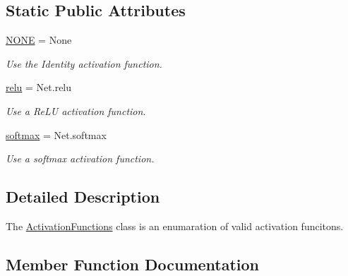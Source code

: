 \subsection*{Static Public Attributes}
\begin{DoxyCompactItemize}
\item 
\hyperlink{classDQN-Deepmind-NIPS-2013_1_1dqn_1_1ConvNet_1_1ActivationFunctions_a6fc2871aa17ddca2628226723a9116f5}{N\+O\+NE} = None
\begin{DoxyCompactList}\small\item\em Use the Identity activation function. \end{DoxyCompactList}\item 
\hyperlink{classDQN-Deepmind-NIPS-2013_1_1dqn_1_1ConvNet_1_1ActivationFunctions_a3684db68eadb8c00ed214af7bcbb2e3c}{relu} = Net.\+relu
\begin{DoxyCompactList}\small\item\em Use a Re\+LU activation function. \end{DoxyCompactList}\item 
\hyperlink{classDQN-Deepmind-NIPS-2013_1_1dqn_1_1ConvNet_1_1ActivationFunctions_a25cfb0b1f9d6d902e50f5bf77bf658a5}{softmax} = Net.\+softmax
\begin{DoxyCompactList}\small\item\em Use a softmax activation function. \end{DoxyCompactList}\end{DoxyCompactItemize}


\subsection{Detailed Description}
The \hyperlink{classDQN-Deepmind-NIPS-2013_1_1dqn_1_1ConvNet_1_1ActivationFunctions}{Activation\+Functions} class is an enumaration of valid activation funcitons. 

\subsection{Member Function Documentation}
\hypertarget{classDQN-Deepmind-NIPS-2013_1_1dqn_1_1ConvNet_1_1ActivationFunctions_a5fc485b9d50dac40bc4db3ba6ca678cc}{}\label{classDQN-Deepmind-NIPS-2013_1_1dqn_1_1ConvNet_1_1ActivationFunctions_a5fc485b9d50dac40bc4db3ba6ca678cc} 
